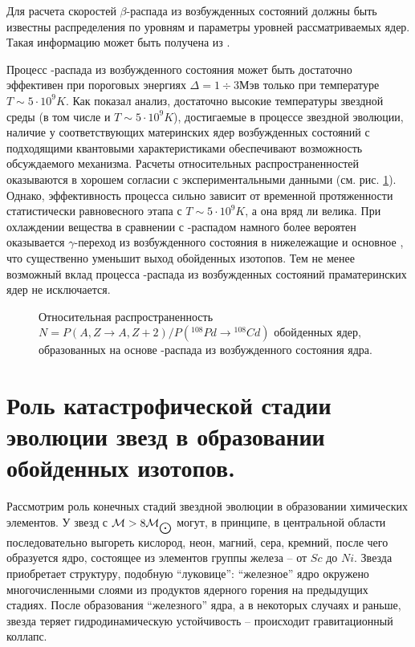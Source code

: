 Для расчета скоростей $\beta$-распада из возбужденных состояний должны быть известны
распределения по уровням и параметры уровней рассматриваемых ядер. Такая
информацию  может быть получена из \cite{isotopes}.

Процесс \be-распада из возбужденного состояния может быть достаточно эффективен
при пороговых энергиях $\Delta=1\div 3 Мэв$ только при температуре
$T\sim 5\cdot 10^9 K$. Как показал анализ, достаточно высокие температуры звездной среды (в том числе
и $T\sim 5\cdot 10^9 K$), достигаемые в процессе звездной эволюции,
 наличие у соответствующих материнских ядер возбужденных состояний с подходящими квантовыми характеристиками
обеспечивают  возможность обсуждаемого  механизма. Расчеты  относительных распространенностей оказываются в  хорошем
согласии с экспериментальными данными (см. рис. \ref{RVOZ}). Однако, эффективность процесса сильно зависит от временной
протяженности статистически равновесного этапа с $T\sim 5\cdot 10^9 K$, а она вряд ли велика. При охлаждении вещества в
сравнении с \be-распадом намного более вероятен оказывается $\gamma$-переход из возбужденного состояния в нижележащие и
основное \cite{solov}, что существенно уменьшит выход обойденных изотопов. Тем не менее возможный вклад процесса
\be-распада из возбужденных состояний праматеринских ядер не исключается.

\begin{figure}
\vspace{18 true cm}
\caption{{ Относительная распространенность $N=P(A,Z\to A,Z+2)/P({}^{108}Pd\to {}^{108}Cd)$
обойденных ядер, образованных на основе \be-распада из возбужденного состояния ядра.}}
\label{RVOZ}
\end{figure}








\section{Роль катастрофической стадии эволюции звезд в образовании
обойденных изотопов.}

Рассмотрим роль конечных стадий звездной эволюции в образовании
химических элементов. У звезд с  ${\cal M} >8 {\cal M}_{\bigodot}$
могут, в принципе, в центральной области последовательно
выгореть кислород, неон, магний, сера, кремний, после чего образуется
ядро, состоящее из элементов группы железа -- от $Sc$ до $Ni$.
Звезда приобретает структуру, подобную ``луковице'': ``железное'' ядро
окружено многочисленными слоями из продуктов ядерного горения
на предыдущих стадиях. После образования ``железного'' ядра, а в некоторых
случаях и раньше, звезда теряет гидродинамическую устойчивость --
происходит гравитационный коллапс.

